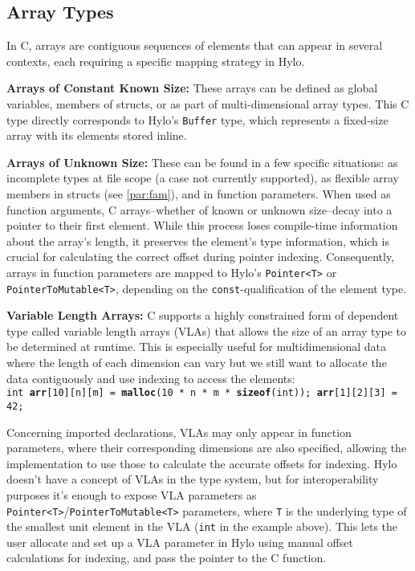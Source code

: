 \subsection{Array Types}
In C, arrays are contiguous sequences of elements that can appear in several contexts\cite{carrays}, each requiring a specific mapping strategy in Hylo.

\textbf{Arrays of Constant Known Size:} These arrays can be defined as global variables, members of structs, or as part of multi-dimensional array types. This C type directly corresponds to Hylo's \texttt{Buffer} type, which represents a fixed-size array with its elements stored inline.

\textbf{Arrays of Unknown Size:} These can be found in a few specific situations: as incomplete types at file scope (a case not currently supported), as flexible array members in structs (see \autoref{par:fam}), and in function parameters. When used as function arguments, C arrays--whether of known or unknown size--decay into a pointer to their first element. While this process loses compile-time information about the array's length, it preserves the element's type information, which is crucial for calculating the correct offset during pointer indexing. Consequently, arrays in function parameters are mapped to Hylo's \texttt{Pointer<T>} or \texttt{PointerToMutable<T>}, depending on the \texttt{const}-qualification of the element type.

\textbf{Variable Length Arrays:}
C supports a highly constrained form of dependent type called variable length arrays (VLAs) that allows the size of an array type to be determined at runtime. This is especially useful for multidimensional data\cite{vla-reddit} where the length of each dimension can vary but we still want to allocate the data contiguously and use indexing to access the elements: \\
\texttt{int \textbf{arr}[10][n][m] = \textbf{malloc}(10 * n * m * \textbf{sizeof}(int)); \space\space\space   \textbf{arr}[1][2][3] = 42;}

Concerning imported declarations, VLAs may only appear in function parameters, where their corresponding dimensions are also specified, allowing the implementation to use those to calculate the accurate offsets for indexing. Hylo doesn't have a concept of VLAs in the type system, but for interoperability purposes it's enough to expose VLA parameters as \texttt{Pointer<T>}/\texttt{PointerToMutable<T>} parameters, where \texttt{T} is the underlying type of the smallest unit element in the VLA (\texttt{int} in the example above). This lets the user allocate and set up a VLA parameter in Hylo using manual offset calculations for indexing, and pass the pointer to the C function.
